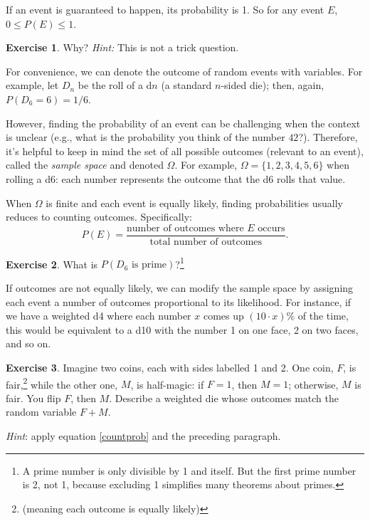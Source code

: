 \documentclass{book}
\theoremstyle{definition}
\newtheorem{exercise}{Exercise}[chapter]
\theoremstyle{colonstylebf}
\newcommand{\set}[1]{\{#1\}}
\begin{document}
If an event is guaranteed to happen, its probability is 1. So for any event $E$, $0 \leq P(E) \leq 1$.
\begin{exercise}
Why? \emph{Hint:} This is not a trick question.
\end{exercise}
For convenience, we can denote the outcome of random events with variables. For example, let $D_n$ be the roll of a d$n$ (a standard $n$-sided die); then, again, $P(D_6 = 6) = 1/6$.

However, finding the probability of an event can be challenging when the context is unclear (e.g., what is the probability you think of the number $42$?). Therefore, it's helpful to keep in mind the set of all possible outcomes (relevant to an event), called the \emph{sample space} and denoted $\Omega$. For example, $\Omega = \set{1, 2, 3, 4, 5, 6}$ when rolling a d6: each number represents the outcome that the d6 rolls that value.

When $\Omega$ is finite and each event is equally likely, finding probabilities usually reduces to counting outcomes. Specifically:
\begin{equation}\label{countprob}
P(E) = \frac{\text{number of outcomes where $E$ occurs}}{\text{total number of outcomes}}.
\end{equation}
\begin{exercise}
What is $P(D_6 \text{ is prime})$?\footnote{A prime number is only divisible by 1 and itself. But the first prime number is 2, not 1, because excluding 1 simplifies many theorems about primes.}
\end{exercise}

If outcomes are not equally likely, we can modify the sample space by assigning each event a number of outcomes proportional to its likelihood. For instance, if we have a weighted d4 where each number $x$ comes up $(10\cdot x)\%$ of the time, this would be equivalent to a d10 with the number 1 on one face, 2 on two faces, and so on. 
\begin{exercise}\label{magiccoin}
  Imagine two coins, each with sides labelled 1 and 2. One coin, $F$, is fair,\footnote{(meaning each outcome is equally likely)} while the other one, $M$, is half-magic: if $F = 1$, then $M = 1$; otherwise, $M$ is fair. You flip $F$, then $M$. Describe a weighted die whose outcomes match the random variable $F + M$.

\noindent\emph{Hint}: apply equation \eqref{countprob} and the preceding paragraph.
\end{exercise}
\end{document}
